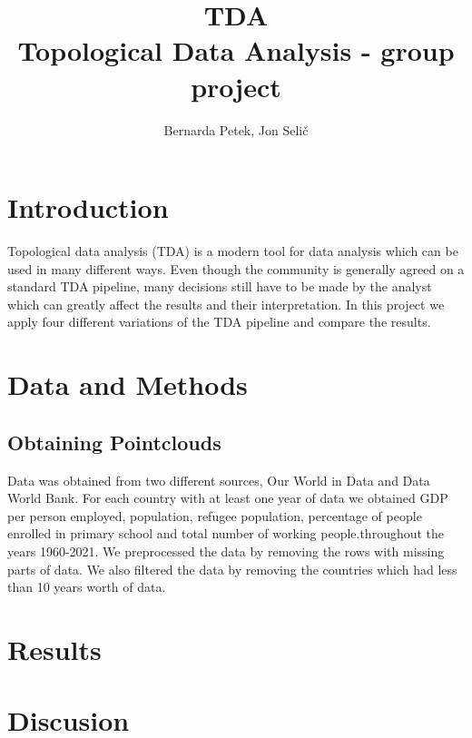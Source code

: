 \documentclass[12pt]{article}
\begin{document}
	
	
	
	
	\title{TDA \\   \large  Topological Data Analysis - group project}
	\author{%
		Bernarda Petek, Jon Selič} %
	
	\date{}
	\maketitle
	
	
	
\section{Introduction}
Topological data analysis (TDA) is a modern tool for data analysis which can be used in many different ways. Even though the community is generally agreed on a standard TDA pipeline, many decisions still have to be made by the analyst which can greatly affect the results and their interpretation. In this project we apply four different variations of the TDA pipeline and compare the results.
\section{Data and Methods}
\subsection{Obtaining Pointclouds}
Data was obtained from two different sources, Our World in Data and Data World Bank. For each country with at least one year of data we obtained GDP per person employed, population, refugee population, percentage of people enrolled in primary school and total number of working people.throughout the years 1960-2021. We preprocessed the data by removing the rows with missing parts of data. We also filtered the data by removing the countries which had less than 10 years worth of data.
\section{Results}
\section{Discusion}
	
	
\end{document}
